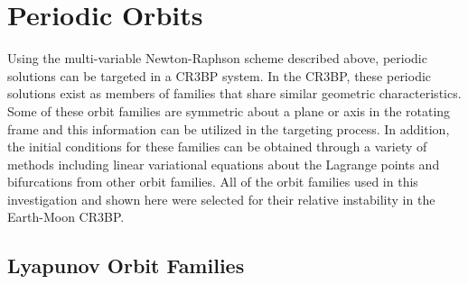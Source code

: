 \section{Periodic Orbits}
Using the multi-variable Newton-Raphson scheme described above, periodic solutions can be targeted
in a CR3BP system. In the CR3BP, these periodic solutions exist as members of families that share
similar geometric characteristics. Some of these orbit families are symmetric about a plane or axis
in the rotating frame and this information can be utilized in the targeting process. In addition,
the initial conditions for these families can be obtained through a variety of methods including
linear variational equations about the Lagrange points and bifurcations from other orbit families.
All of the orbit families used in this investigation and shown here were selected for their
relative instability in the Earth-Moon CR3BP.

\subsection{Lyapunov Orbit Families}
